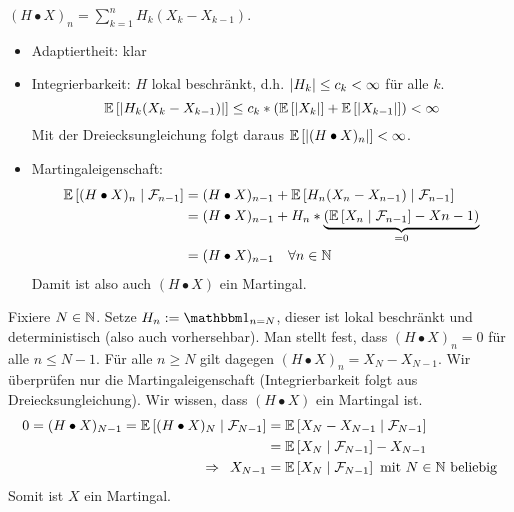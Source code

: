 \begin{proof_equiv}
	\hinrichtung $(H \bullet X)_n = \sum_{k=1}^n H_k (X_k - X_{k-1})$.
	\begin{itemize}
		\item Adaptiertheit: klar
		\item Integrierbarkeit: $H$ lokal beschränkt, d.h. $\left| H_k \right| \le c_k < \infty$ für alle $k$.
		\begin{equation*}
			\mathbb{E} \left[ \left| H_k (X_k - X_{k-1}) \right| \right] \le c_k * \left( \mathbb{E} \left[ \left| X_k \right| \right] + \mathbb{E} \left[ \left| X_{k-1} \right| \right] \right) < \infty
		\end{equation*}
		Mit der Dreiecksungleichung folgt daraus $\mathbb{E} \left[ \left| (H \bullet X)_n \right| \right] < \infty$.
		\item Martingaleigenschaft: 
		\begin{equation*}
			\begin{aligned}
				\mathbb{E} \left[ (H \bullet X)_n \mid \mathcal{F}_{n-1} \right] &
				= (H \bullet X)_{n-1} + \mathbb{E} \left[ H_n (X_n - X_{n-1}) \mid \mathcal{F}_{n-1} \right] \\
				& = (H \bullet X)_{n-1} + H_n * \underbrace{\left( \mathbb{E} \left[ X_n \mid \mathcal{F}_{n-1} \right] - X{n-1} \right)}_{=0} \\
				& = (H \bullet X)_{n-1} \quad \forall n \in \mathbb{N}
			\end{aligned}
		\end{equation*}
		Damit ist also auch $(H \bullet X)$ ein Martingal.		
	\end{itemize}
	\rueckrichtung Fixiere $N \in \mathbb{N}$. Setze $H_n \defeq \one_{n = N}$, dieser ist lokal beschränkt und deterministisch (also auch vorhersehbar). Man stellt fest, dass $(H \bullet X)_n = 0$ für alle $n \le N-1$. Für alle $n \ge N$ gilt dagegen $(H \bullet X)_n = X_N - X_{N-1}$. Wir überprüfen nur die Martingaleigenschaft (Integrierbarkeit folgt aus Dreiecksungleichung). Wir wissen, dass $(H \bullet X)$ ein Martingal ist. 
	\begin{align*}
		0 = (H \bullet X)_{N-1} 
		= \mathbb{E} \left[ (H \bullet X)_N \mid \mathcal{F}_{N-1} \right]
		& = \mathbb{E} \left[ X_N - X_{N-1} \mid \mathcal{F}_{N-1} \right] \\
		& = \mathbb{E} \left[ X_N \mid \mathcal{F}_{N-1} \right] - X_{N-1} \\
		\enskip \Rightarrow \enskip X_{N-1} &= \mathbb{E} \left[ X_N \mid \mathcal{F}_{N-1} \right] \text{ mit } N \in \mathbb{N} \text{ beliebig}
	\end{align*}
	Somit ist $X$ ein Martingal.
\end{proof_equiv}

